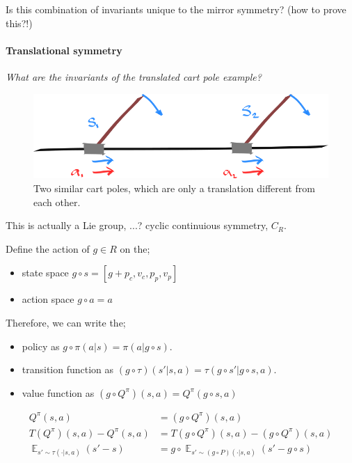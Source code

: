 Is this combination of invariants unique to the mirror symmetry? (how to prove this?!)

\paragraph{Translational symmetry}

\begin{displayquote}
\textit{What are the invariants of the translated cart pole example?}
\end{displayquote}

\begin{figure}[h!]
\centering
\includegraphics[width=1\textwidth,height=0.25\textheight]{../../pictures/drawings/cart-pole-translation.png}
\caption{Two similar cart poles, which are only a translation different from each other.}
\end{figure}

This is actually a Lie group, ...? cyclic continuious symmetry, $C_R$.


Define the action of $g \in R$ on the;

\begin{itemize}
	\tightlist
	\item state space $g \circ s = [g+p_c, v_c, p_p, v_p]$
	\item action space $g \circ a = a$
\end{itemize}

Therefore, we can write the;
\begin{itemize}
  \tightlist
 	\item policy as $g \circ \pi(a | s) = \pi(a | g \circ s)$.
	\item transition function as $(g \circ \tau)(s' | s, a) = \tau(g \circ  s'| g \circ  s,  a)$.
	\item value function as $(g \circ  Q^{\pi})(s, a) = Q^\pi(g \circ  s,  a)$
\end{itemize}

\begin{align*}
Q^\pi(s, a) &= (g \circ Q^{\pi})(s, a) \tag{expected return}\\
T(Q^\pi)(s,a) - Q^\pi(s,a) &=T(g \circ Q^\pi)(s, a) - (g \circ Q^\pi)(s,a) \tag{Bellman residual}\\
\mathop{\mathbb E}_{s' \sim \tau(\cdot| s, a)} (s' - s) &= g \circ \mathop{\mathbb E}_{s' \sim (g \circ P)(\cdot| s, a)} (s' - g \circ s) \tag{change in state}\\
\end{align*}


